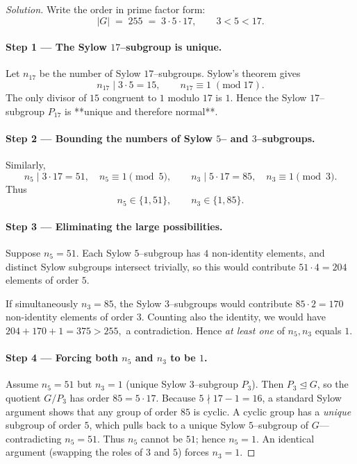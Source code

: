 \documentclass[12pt]{article}
\theoremstyle{definition} %
\theoremstyle{plain} %
\begin{document}
    \begin{proof}[Solution]
    Write the order in prime factor form:
    \[
        |G| \;=\; 255 \;=\; 3\cdot 5\cdot 17 ,
    \qquad
        3<5<17.
    \]
    
    \paragraph{Step 1 — The Sylow $17$–subgroup is unique.}
    Let $n_{17}$ be the number of Sylow $17$–subgroups.  
    Sylow’s theorem gives
    \[
        n_{17}\mid 3\cdot 5=15,
        \qquad
        n_{17}\equiv 1 \;(\mathrm{mod}\; 17).
    \]
    The only divisor of $15$ congruent to $1$ modulo $17$ is $1$.  
    Hence the Sylow $17$–subgroup $P_{17}$ is **unique and therefore normal**.
    
    \paragraph{Step 2 — Bounding the numbers of Sylow $5$– and $3$–subgroups.}
    Similarly,
    \[
        n_{5}\mid 3\cdot 17 = 51, \quad n_{5}\equiv 1\pmod{5},
    \qquad
        n_{3}\mid 5\cdot 17 = 85, \quad n_{3}\equiv 1\pmod{3}.
    \]
    Thus
    \[
        n_{5}\in\{1,51\},
    \qquad
        n_{3}\in\{1,85\}.
    \]
    
    \paragraph{Step 3 — Eliminating the large possibilities.}
    Suppose $n_{5}=51$.  
    Each Sylow $5$–subgroup has $4$ non-identity elements, and distinct Sylow subgroups intersect trivially, so this would contribute
    \(
        51\cdot 4 = 204
    \)
    elements of order $5$.
    
    If simultaneously $n_{3}=85$, the Sylow $3$–subgroups would contribute 
    \(85\cdot 2 = 170\) non-identity elements of order $3$.  
    Counting also the identity, we would have
    \(
        204 + 170 + 1 = 375 > 255,
    \)
    a contradiction.  
    Hence \emph{at least one} of $n_{5},n_{3}$ equals $1$.
    
    \paragraph{Step 4 — Forcing both $n_{5}$ and $n_{3}$ to be $1$.}
    Assume $n_{5}=51$ but $n_{3}=1$ (unique Sylow $3$–subgroup $P_{3}$).  
    Then $P_{3}\trianglelefteq G$, so the quotient
    \(
        G/P_{3}
    \)
    has order $85 = 5\cdot 17$.  
    Because $5\nmid 17-1=16$, a standard Sylow argument shows that any group of order $85$ is cyclic.  
    A cyclic group has a \emph{unique} subgroup of order $5$, which pulls back to a unique Sylow $5$–subgroup of $G$—contradicting $n_{5}=51$.  
    Thus $n_{5}$ cannot be $51$; hence $n_{5}=1$.  
    An identical argument (swapping the roles of $3$ and $5$) forces $n_{3}=1$.
    

\end{proof}
\end{document}
